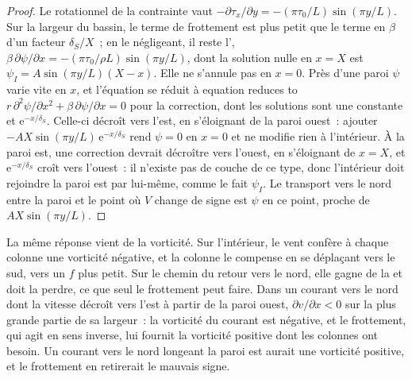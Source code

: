 \begin{proof}
Le rotationnel de la contrainte vaut $-\partial\tau_x/\partial y = -(\pi\tau_0/L)\sin(\pi
y/L)$. Sur la largeur du bassin, le terme de frottement est plus petit que le
terme en $\beta$ d'un facteur $\delta_S/X$~; en le négligeant, il reste l',
$\beta\,\partial\psi/\partial x = -(\pi\tau_0/\rho L)\sin(\pi y/L)$, dont la solution
nulle en $x = X$ est $\psi_I = A\sin(\pi y/L)(X - x)$. Elle ne
s'annule pas en $x = 0$. Près d'une paroi $\psi$ varie vite en $x$, et l'équation se réduit à
equation reduces to $r\,\partial^2\psi/\partial x^2 + \beta\,\partial\psi/
\partial x = 0$ pour la correction, dont les solutions sont une constante et
$\mathrm e^{-x/\delta_S}$. Celle-ci décroît vers l'est, en s'éloignant de la
paroi ouest~: ajouter $-AX\sin(\pi y/L)\,\mathrm e^{-x/\delta_S}$ rend $\psi = 0$
en $x = 0$ et ne modifie rien à l'intérieur. À la paroi est, une correction
devrait décroître vers l'ouest, en s'éloignant de $x = X$, et
$\mathrm e^{-x/\delta_S}$ croît vers l'ouest~: il n'existe pas de couche de ce type, donc
l'intérieur doit rejoindre la paroi est par lui-même, comme le fait $\psi_I$. Le
transport vers le nord entre la paroi et le point où $V$ change de signe
est $\psi$ en ce point, proche de $AX\sin(\pi y/L)$.
\end{proof}

La même réponse vient de la vorticité. Sur l'intérieur, le vent confère à chaque colonne
une vorticité négative, et la colonne le compense en se déplaçant
vers le sud, vers un $f$ plus petit. Sur le chemin du retour vers le nord, elle gagne de la 
et doit la perdre, ce que seul le frottement peut faire. Dans un courant vers le nord
dont la vitesse décroît vers l'est à partir de la paroi ouest, $\partial
v/\partial x < 0$ sur la plus grande partie de sa largeur~: la vorticité du courant est négative, et le frottement, qui agit en sens inverse,
lui fournit la vorticité positive dont les colonnes ont besoin. Un courant vers le nord
longeant la paroi est aurait une vorticité positive, et
le frottement en retirerait le mauvais signe.

